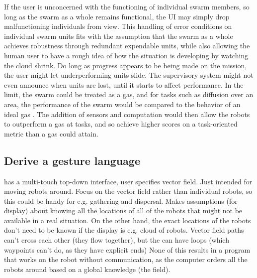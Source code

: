 \documentclass[]{article}
\begin{document}
If the user is unconcerned with the functioning of individual swarm members, so long as the swarm as a whole remains functional, the UI may simply drop malfunctioning individuals from view. 
This handling of error conditions on individual swarm units fits with the assumption that the swarm as a whole achieves robustness through redundant expendable units, while also allowing the human user to have a rough idea of how the situation is developing by watching the cloud shrink. 
Do long as progress appears to be being made on the mission, the user might let underperforming units slide. 
The supervisory system might not even announce when units are lost, until it starts to affect performance.  
In the limit, the swarm could be treated as a gas, and for tasks such as diffusion over an area, the performance of the swarm would be compared to the behavior of an ideal gas \cite{jantz1997kinetics}.
The addition of sensors and computation would then allow the robots to outperform a gas at tasks, and so achieve higher scores on a task-oriented metric than a gas could attain. 
 

\subsection{Derive a gesture language}

\cite{Kato:2009:MIC:1520340.1520500} has a multi-touch top-down interface, user specifies vector field. Just intended for moving robots around. Focus on the vector field rather than individual robots, so this could be handy for e.g. gathering and dispersal. Makes assumptions (for display) about knowing all the locations of all of the robots that might not be available in a real situation. On the other hand, the exact locations of the robots don't need to be known if the display is e.g. cloud of robots. Vector field paths can't cross each other (they flow together), but the can have loops (which waypoints can't do, as they have explicit ends) None of this results in a program that works on the robot without communication, as the computer orders all the robots around based on a global knowledge (the field).
\end{document}
